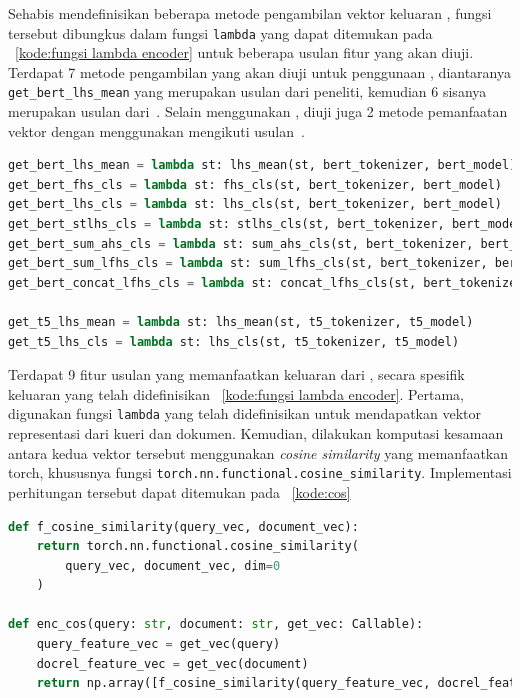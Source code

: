 Sehabis mendefinisikan beberapa metode pengambilan vektor keluaran \hs{}, fungsi tersebut dibungkus dalam fungsi \lstinline{lambda} yang dapat ditemukan pada \kode{}~\ref{kode:fungsi lambda encoder} untuk beberapa usulan fitur yang akan diuji. Terdapat 7 metode pengambilan yang akan diuji untuk penggunaan \bert{}, diantaranya \lstinline{get_bert_lhs_mean} yang merupakan usulan dari peneliti, kemudian 6 sisanya merupakan usulan dari~\citet{devlin2018bert}. Selain menggunakan \bert{}, diuji juga 2 metode pemanfaatan vektor dengan menggunakan \encoder{} \tfive{} mengikuti usulan~\citet{ni2021sentence}.
\begin{lstlisting}[language=Python, caption={Fungsi lambda pengambilan vektor}, label={kode:fungsi lambda encoder}]
get_bert_lhs_mean = lambda st: lhs_mean(st, bert_tokenizer, bert_model)
get_bert_fhs_cls = lambda st: fhs_cls(st, bert_tokenizer, bert_model)
get_bert_lhs_cls = lambda st: lhs_cls(st, bert_tokenizer, bert_model)
get_bert_stlhs_cls = lambda st: stlhs_cls(st, bert_tokenizer, bert_model)
get_bert_sum_ahs_cls = lambda st: sum_ahs_cls(st, bert_tokenizer, bert_model)
get_bert_sum_lfhs_cls = lambda st: sum_lfhs_cls(st, bert_tokenizer, bert_model)
get_bert_concat_lfhs_cls = lambda st: concat_lfhs_cls(st, bert_tokenizer, bert_model)

get_t5_lhs_mean = lambda st: lhs_mean(st, t5_tokenizer, t5_model)
get_t5_lhs_cls = lambda st: lhs_cls(st, t5_tokenizer, t5_model)
\end{lstlisting}


Terdapat 9 fitur usulan yang memanfaatkan keluaran dari \encoder{}, secara spesifik keluaran yang telah didefinisikan \kode{}~\ref{kode:fungsi lambda encoder}. Pertama, digunakan fungsi \lstinline{lambda} yang telah didefinisikan untuk mendapatkan vektor representasi dari kueri dan dokumen. Kemudian, dilakukan komputasi kesamaan antara kedua vektor tersebut menggunakan \textit{cosine similarity} yang memanfaatkan \library{} torch, khususnya fungsi \lstinline{torch.nn.functional.cosine_similarity}. Implementasi perhitungan tersebut dapat ditemukan pada \kode{}~\ref{kode:cos}
\begin{lstlisting}[language=Python, caption={Fungsi ekstraksi fitur \textit{cosine\_similarity}}, label={kode:cos}]
def f_cosine_similarity(query_vec, document_vec):
    return torch.nn.functional.cosine_similarity(
        query_vec, document_vec, dim=0
    )

def enc_cos(query: str, document: str, get_vec: Callable):
    query_feature_vec = get_vec(query)
    docrel_feature_vec = get_vec(document)
    return np.array([f_cosine_similarity(query_feature_vec, docrel_feature_vec)])
\end{lstlisting}

